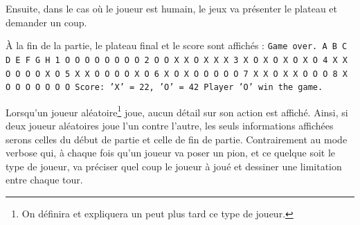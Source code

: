 \documentclass{report}
\begin{document}
Ensuite, dans le cas où le joueur est humain, le jeux va présenter le plateau et demander un coup.

À la fin de la partie, le plateau final et le score sont affichés : \newline\newline
\texttt{Game over.\newline
\newline
\tabto{1 cm}A B C D E F G H\newline
\tabto{0.62 cm}  1 O O O O O O O O\newline
\tabto{0.62 cm}  2 O O X X O X X X\newline
\tabto{0.62 cm}  3 X O X O X O X O\newline
\tabto{0.62 cm}  4 X X O O O O X O\newline
\tabto{0.62 cm}  5 X X O O O O X O\newline
\tabto{0.62 cm}  6 X O X O O O O O\newline
\tabto{0.62 cm}  7 X X O X X O O O\newline
\tabto{0.62 cm}  8 X O O O O O O O\newline
\newline
Score: 'X' = 22, 'O' = 42\newline
Player 'O' win the game.}\newline

Lorsqu'un joueur aléatoire\footnote{On définira et expliquera un peut plus tard ce type de joueur.} joue, aucun détail sur son action est affiché. Ainsi, si deux joueur aléatoires joue l'un contre l'autre, les seuls informations affichées serons celles du début
de partie et celle de fin de partie. Contrairement au mode verbose qui, à chaque fois qu'un joueur va poser un pion, et ce quelque soit le type de joueur, va préciser quel coup le joueur à joué et dessiner une limitation entre chaque tour.
\end{document}
